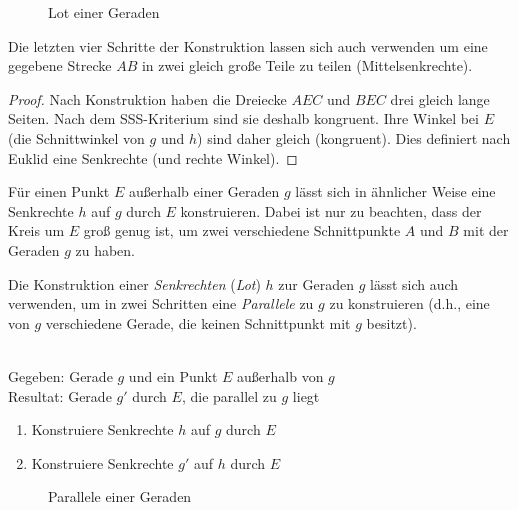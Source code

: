 
\begin{figure}[h]
    
    \caption{Lot einer Geraden}
\end{figure}

Die letzten vier Schritte der Konstruktion lassen sich auch verwenden um eine gegebene Strecke $AB$
in zwei gleich große Teile zu teilen (Mittelsenkrechte).


\begin{proof}
    Nach Konstruktion haben die Dreiecke $AEC$ und $BEC$ drei gleich lange Seiten. Nach dem
    SSS-Kriterium sind sie deshalb kongruent. Ihre Winkel bei $E$ (die Schnittwinkel von $g$ und
    $h$) sind daher gleich (kongruent). Dies definiert nach Euklid eine Senkrechte (und rechte
    Winkel).
\end{proof}

Für einen Punkt $E$ außerhalb einer Geraden $g$ lässt sich in ähnlicher Weise eine Senkrechte $h$
auf $g$ durch $E$ konstruieren. Dabei ist nur zu beachten, dass der Kreis um $E$ groß genug ist, um
zwei verschiedene Schnittpunkte $A$ und $B$ mit der Geraden $g$ zu haben.

Die Konstruktion einer {\em Senkrechten} ({\em Lot}) $h$ zur Geraden $g$ lässt sich auch verwenden,
um in zwei Schritten eine {\em Parallele} zu $g$ zu konstruieren (d.h., eine von $g$ verschiedene
Gerade, die keinen Schnittpunkt mit $g$ besitzt).

\begin{konst}\ \\
    Gegeben: Gerade $g$ und ein Punkt $E$ außerhalb von $g$\\
    Resultat: Gerade $g'$ durch $E$, die parallel zu $g$ liegt
    \renewcommand{\labelenumi}{\arabic{enumi}.} %
    \begin{enumerate}
        \item Konstruiere Senkrechte $h$ auf $g$ durch $E$
        \item Konstruiere Senkrechte $g'$ auf $h$ durch $E$
    \end{enumerate}
\end{konst}

\begin{figure}[h]
    
    \caption{Parallele einer Geraden}
\end{figure}

